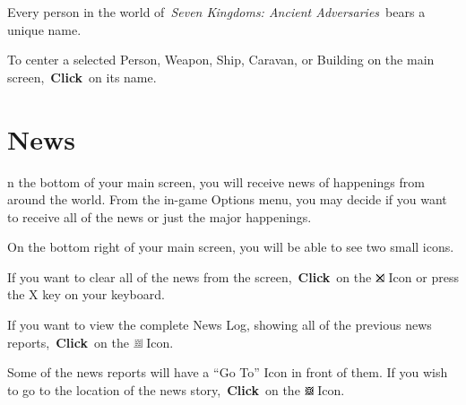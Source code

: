 Every person in the world of \textit{Seven Kingdoms: Ancient Adversaries} bears a unique name.


To center a selected Person, Weapon, Ship, Caravan, or Building on the main screen, \textbf{Click} on its name.

\section{News}


n the bottom of your main screen, you will receive news of happenings from around the world. From the in-game Options menu, you may decide if you want to receive all of the news or just the major happenings.

On the bottom right of your main screen, you will be able to see two small icons.

If you want to clear all of the news from the screen, \textbf{Click} on the \includegraphics[width=0.02\linewidth]{Bx} Icon or press the X key on your keyboard.

If you want to view the complete News Log, showing all of the previous news reports, \textbf{Click} on the \includegraphics[width=0.02\linewidth]{Bnews} Icon.

Some of the news reports will have a “Go To” Icon in front of them. If you wish to go to the location of the news story, \textbf{Click} on the \includegraphics[width=0.02\linewidth]{Bgoto} Icon.